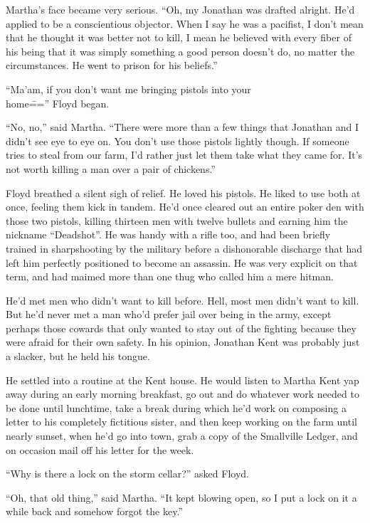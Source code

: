 Martha's face became very serious. ``Oh, my Jonathan was drafted
alright. He'd applied to be a conscientious objector. When I say he was
a pacifist, I don't mean that he thought it was better not to kill, I
mean he believed with every fiber of his being that it was simply
something a good person doesn't do, no matter the circumstances. He went
to prison for his beliefs.''

``Ma'am, if you don't want me bringing pistols into your \\ home\==='' Floyd
began.

``No, no,'' said Martha. ``There were more than a few things that
Jonathan and I didn't see eye to eye on. You don't use those pistols
lightly though. If someone tries to steal from our farm, I'd rather just
let them take what they came for. It's not worth killing a man over a
pair of chickens.''

Floyd breathed a silent sigh of relief. He loved his pistols. He liked
to use both at once, feeling them kick in tandem. He'd once cleared out
an entire poker den with those two pistols, killing thirteen men with
twelve bullets and earning him the nickname ``Deadshot''. He was handy
with a rifle too, and had been briefly trained in sharpshooting by the
military before a dishonorable discharge that had left him perfectly
positioned to become an assassin. He was very explicit on that term, and
had maimed more than one thug who called him a mere hitman.

He'd met men who didn't want to kill before. Hell, most men didn't want
to kill. But he'd never met a man who'd prefer jail over being in the
army, except perhaps those cowards that only wanted to stay out of the
fighting because they were afraid for their own safety. In his opinion,
Jonathan Kent was probably just a slacker, but he held his tongue.

He settled into a routine at the Kent house. He would listen to Martha
Kent yap away during an early morning breakfast, go out and do whatever
work needed to be done until lunchtime, take a break during which he'd
work on composing a letter to his completely fictitious sister, and then
keep working on the farm until nearly sunset, when he'd go into town,
grab a copy of the Smallville Ledger, and on occasion mail off his
letter for the week.

``Why is there a lock on the storm cellar?'' asked Floyd.

``Oh, that old thing,'' said Martha. ``It kept blowing open, so I put a
lock on it a while back and somehow forgot the key.''

